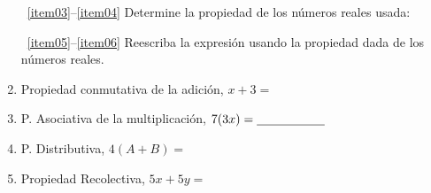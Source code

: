 \documentclass[10pt,twoside]{article}
\begin{document}
\begin{enumerate}
\begin{enumerate}
  \end{enumerate}
~\ref{item03}--\ref{item04} Determine la propiedad de los números reales usada:
~\ref{item05}--\ref{item06} Reescriba la expresi\'{o}n usando la propiedad dada de los n\'{u}meros reales.
\item Propiedad conmutativa de la adición,\; $x+3=$\underline{\hspace*{55pt}}\label{item05}
\item P. Asociativa de la multiplicación, \; $7(3x)=\underline{\hspace*{55pt}}$
\item P. Distributiva, \; $4(A+B)=$\underline{\hspace*{55pt}}
\item Propiedad Recolectiva, \; $5x+5y=$\underline{\hspace*{55pt}}\label{item06}


\end{enumerate}
\end{document}

